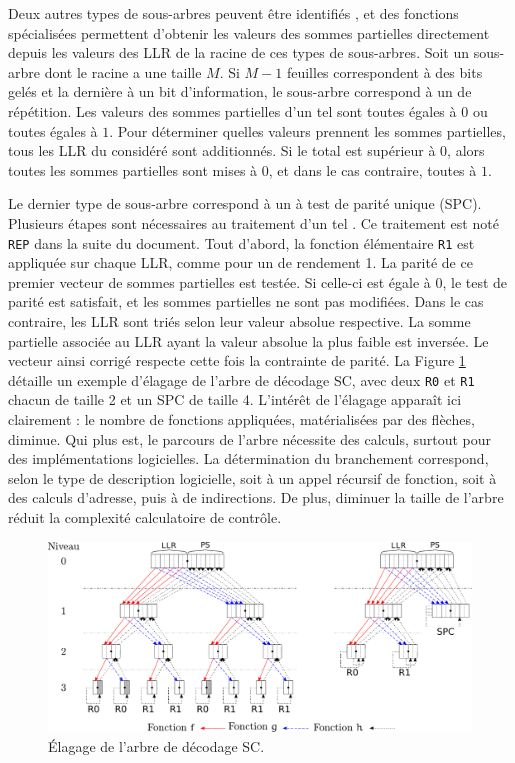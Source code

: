 Deux autres types de sous-arbres peuvent être identifiés \cite{sarkis_fast_2014}, et des fonctions spécialisées permettent d'obtenir les valeurs des sommes partielles directement depuis les valeurs des LLR de la racine de ces types de sous-arbres. Soit un sous-arbre dont le \noeud racine a une taille $M$. Si $M-1$ feuilles correspondent à des bits gelés et la dernière à un bit d'information, le sous-arbre correspond à un \noeud de répétition. Les valeurs des sommes partielles d'un tel \noeud sont toutes égales à $0$ ou toutes égales à $1$. Pour déterminer quelles valeurs prennent les sommes partielles, tous les LLR du \noeud considéré sont additionnés. Si le total est supérieur à 0, alors toutes les sommes partielles sont mises à $0$, et dans le cas contraire, toutes à $1$.

Le dernier type de sous-arbre correspond à un \noeud à test de parité unique (SPC). Plusieurs étapes sont nécessaires au traitement d'un tel \noeud. Ce traitement est noté \texttt{REP} dans la suite du document. Tout d'abord, la fonction élémentaire \texttt{R1} est appliquée sur chaque LLR, comme pour un \noeud de rendement 1. La parité de ce premier vecteur de sommes partielles est testée. Si celle-ci est égale à 0, le test de parité est satisfait, et les sommes partielles ne sont pas modifiées. Dans le cas contraire, les LLR sont triés selon leur valeur absolue respective. La somme partielle associée au LLR ayant la valeur absolue la plus faible est inversée. Le vecteur ainsi corrigé respecte cette fois la contrainte de parité. La Figure \ref{fig:sc_pruned} détaille un exemple d'élagage de l'arbre de décodage SC, avec deux \noeuds \texttt{R0} et \texttt{R1} chacun de taille 2 et un \noeud SPC de taille 4. L'intérêt de l'élagage apparaît ici clairement : le nombre de fonctions appliquées, matérialisées par des flèches, diminue. Qui plus est, le parcours de l'arbre nécessite des calculs, surtout pour des implémentations logicielles. La détermination du branchement correspond, selon le type de description logicielle, soit à un appel récursif de fonction, soit à des calculs d'adresse, puis à de indirections. De plus, diminuer la taille de l'arbre réduit la complexité calculatoire de contrôle.

\begin{figure}[h]
  \centering
  \includegraphics[width=\textwidth]{main/ch1_fig/sc_tree_pruned.pdf}
  \caption{\'Elagage de l'arbre de décodage SC.}
  \label{fig:sc_pruned}
\end{figure}

